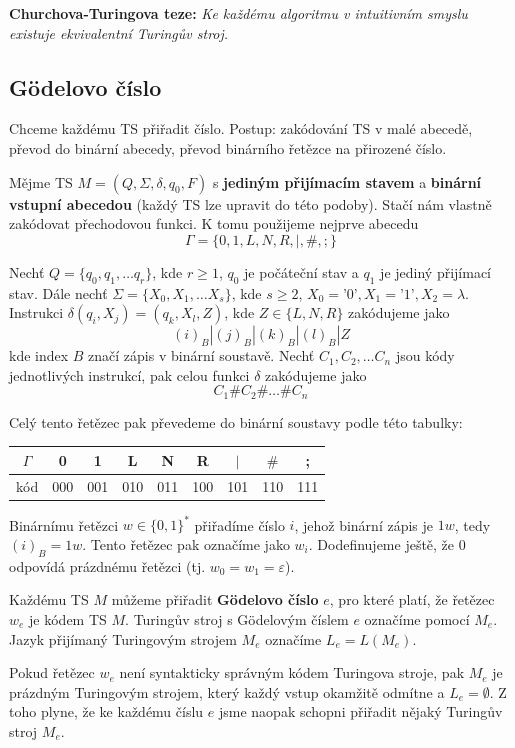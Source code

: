 \documentclass[11pt]{report} %
\numberwithin{equation}{section}
\begin{document}
\noindent\textbf{Churchova-Turingova teze:} \textit{Ke každému algoritmu v intuitivním smyslu existuje ekvivalentní Turingův stroj.}

\subsection{Gödelovo číslo}
Chceme každému TS přiřadit číslo. Postup: zakódování TS v malé abecedě, převod do binární abecedy, převod binárního řetězce na přirozené číslo. 

Mějme TS $M = (Q, \Sigma, \delta, q_0, F)$ s \textbf{jediným přijímacím stavem} a \textbf{binární vstupní abecedou} (každý TS lze upravit do této podoby). Stačí nám vlastně zakódovat přechodovou funkci. K tomu použijeme nejprve abecedu
$$\Gamma = \{0, 1, L, N, R, |, \#, ;\}$$

Nechť $Q = \{q_0, q_1, \dots q_r\}$, kde $r \geq 1$, $q_0$ je počáteční stav a $q_1$ je jediný přijímací stav. Dále nechť $\Sigma = \{X_0, X_1, \dots X_s\}$, kde $s \geq 2$, $X_0 = \text{'0'}, X_1 = \text{'1'}, X_2 = \lambda$. Instrukci $\delta(q_i, X_j) = (q_k, X_l, Z)$, kde $Z \in \{L,N,R\}$ zakódujeme jako
$$(i)_B|(j)_B|(k)_B|(l)_B|Z$$
kde index $B$ značí zápis v binární soustavě. Nechť $C_1, C_2, \dots C_n$ jsou kódy jednotlivých instrukcí, pak celou funkci $\delta$ zakódujeme jako 
$$C_1\#C_2\#\dots\#C_n$$

Celý tento řetězec pak převedeme do binární soustavy podle této tabulky:
\begin{table}[H]
	\centering
	\begin{tabular}{|c|c|c|c|c|c|c|c|c|}
		\hline
		$\Gamma$ & 0 & 1 & L & N & R & $|$ & $\#$ & ; \\ \hline
		kód & 000 & 001 & 010 & 011 & 100 & 101 & 110 & 111 \\ \hline
	\end{tabular}
\end{table}

Binárnímu řetězci $w \in \{0, 1\}^*$ přiřadíme číslo $i$, jehož binární zápis je $1w$, tedy $(i)_B = 1w$. Tento řetězec pak označíme jako $w_i$. Dodefinujeme ještě, že 0 odpovídá prázdnému řetězci (tj. $w_0 = w_1 = \varepsilon$).

Každému TS $M$ můžeme přiřadit \textbf{Gödelovo číslo} $e$, pro které platí, že řetězec $w_e$ je kódem TS $M$. Turingův stroj s Gödelovým číslem $e$ označíme pomocí $M_e$. Jazyk přijímaný Turingovým strojem $M_e$ označíme $L_e  = L(M_e)$.

Pokud řetězec $w_e$ není syntakticky správným kódem Turingova stroje, pak $M_e$ je prázdným Turingovým strojem,
který každý vstup okamžitě odmítne a $L_e = \emptyset$. Z toho plyne, že ke každému číslu $e$ jsme naopak schopni
přiřadit nějaký Turingův stroj $M_e$.
\end{document}
